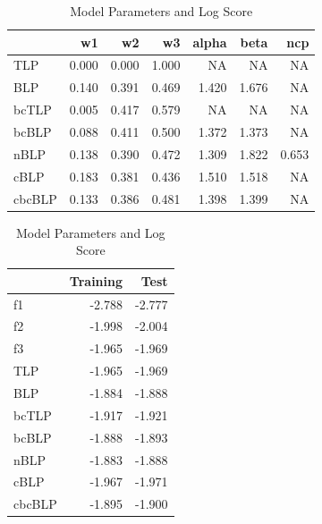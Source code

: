 \documentclass[]{article}
\begin{document}
\begin{table}[!h]
\caption{\label{tab:unnamed-chunk-8}Model Parameters and Log Score}

\centering
\begin{tabular}[t]{lrrrrrr}
\toprule
  & w1 & w2 & w3 & alpha & beta & ncp\\
\midrule
\rowcolor{gray!6}  TLP & 0.000 & 0.000 & 1.000 & NA & NA & NA\\
BLP & 0.140 & 0.391 & 0.469 & 1.420 & 1.676 & NA\\
\rowcolor{gray!6}  bcTLP & 0.005 & 0.417 & 0.579 & NA & NA & NA\\
bcBLP & 0.088 & 0.411 & 0.500 & 1.372 & 1.373 & NA\\
\rowcolor{gray!6}  nBLP & 0.138 & 0.390 & 0.472 & 1.309 & 1.822 & 0.653\\
\addlinespace
cBLP & 0.183 & 0.381 & 0.436 & 1.510 & 1.518 & NA\\
\rowcolor{gray!6}  cbcBLP & 0.133 & 0.386 & 0.481 & 1.398 & 1.399 & NA\\
\bottomrule
\end{tabular}
\centering
\begin{tabular}[t]{lrr}
\toprule
  & Training & Test\\
\midrule
\rowcolor{gray!6}  f1 & -2.788 & -2.777\\
f2 & -1.998 & -2.004\\
\rowcolor{gray!6}  f3 & -1.965 & -1.969\\
TLP & -1.965 & -1.969\\
\rowcolor{gray!6}  BLP & -1.884 & -1.888\\
\addlinespace
bcTLP & -1.917 & -1.921\\
\rowcolor{gray!6}  bcBLP & -1.888 & -1.893\\
nBLP & -1.883 & -1.888\\
\rowcolor{gray!6}  cBLP & -1.967 & -1.971\\
cbcBLP & -1.895 & -1.900\\
\bottomrule
\end{tabular}
\end{table}
\end{document}
